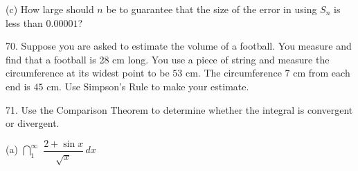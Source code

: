 \documentclass{sebase}
\begin{document}
\begin{multicols}{2}
\begin{ExerciseList}
\begin{ExerciseList}
%

%

\item[(c)] How large should $n$ be to guarantee that the size of the error
in using $S_{n}$ is less than $0.00001$?

%

%
\end{ExerciseList}

\item[\hfill 70.] Suppose you are asked to estimate the volume of a
football. You measure and find that a football is 28 cm long. You use a
piece of string and measure the circumference at its widest point to be $53$
cm. The circumference $7$ cm from each end is $45$ cm. Use Simpson's Rule to
make your estimate.\\[4pt]
\hspace*{\fill}\hspace*{\fill}

%

\item[\hfill 71.] Use the Comparison Theorem to determine whether the
integral is convergent or divergent.

\begin{ExerciseList}
\item[(a)] $\dint\nolimits_{1}^{\infty }\,\,\dfrac{2+\sin x}{\sqrt{x}}\,dx$


\end{ExerciseList}
\end{ExerciseList}
\end{multicols}
\end{document}
